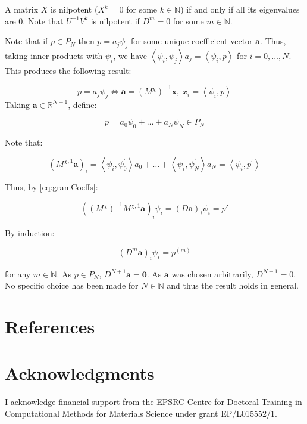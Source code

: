\documentclass[twoside,english,final,5p,times,twocolumn]{elsarticle}
\begin{document}
A matrix $X$ is nilpotent ($X^{k}=0$ for some $k\in\mathbb{N}$)
if and only if all its eigenvalues are 0. Note that $U^{-1}V^{k}$
is nilpotent if $D^{m}=0$ for some $m\in\mathbb{N}$.

Note that if $p\in P_{N}$ then $p=a_{j}\psi_{j}$ for some unique
coefficient vector $\boldsymbol{a}$. Thus, taking inner products
with $\psi_{i}$, we have $\left\langle \psi_{i},\psi_{j}\right\rangle a_{j}=\left\langle \psi_{i},p\right\rangle $
for $i=0,...,N$. This produces the following result:

\begin{equation}
p=a_{j}\psi_{j}\Leftrightarrow\boldsymbol{a}=\left(M^{\chi}\right)^{-1}\boldsymbol{x},\;x_{i}=\left\langle \psi_{i},p\right\rangle \label{eq:gramCoeffs}
\end{equation}
 Taking $\boldsymbol{a}\in\mathbb{R}^{N+1}$, define:

\begin{equation}
p=a_{0}\psi_{0}+\ldots+a_{N}\psi_{N}\in P_{N}
\end{equation}

Note that:

\begin{equation}
\left(M^{\chi,1}\boldsymbol{a}\right)_{i}=\left\langle \psi_{i},\psi_{0}^{'}\right\rangle a_{0}+\ldots+\left\langle \psi_{i},\psi_{N}^{'}\right\rangle a_{N}=\left\langle \psi_{i},p^{'}\right\rangle 
\end{equation}

Thus, by \eqref{eq:gramCoeffs}:

\begin{equation}
\left(\left(M^{\chi}\right)^{-1}M^{\chi,1}\boldsymbol{a}\right)_{i}\psi_{i}=\left(D\boldsymbol{a}\right)_{i}\psi_{i}=p'
\end{equation}

By induction:

\begin{equation}
\left(D^{m}\boldsymbol{a}\right)_{i}\psi_{i}=p^{\left(m\right)}
\end{equation}

for any $m\in\mathbb{N}$. As $p\in P_{N}$, $D^{N+1}\boldsymbol{a}=\boldsymbol{0}$.
As $\boldsymbol{a}$ was chosen arbitrarily, $D^{N+1}=0$. No specific
choice has been made for $N\in\mathbb{N}$ and thus the result holds
in general.

\section{References}




\section{Acknowledgments}

I acknowledge financial support from the EPSRC Centre for Doctoral
Training in Computational Methods for Materials Science under grant
EP/L015552/1.
\end{document}
